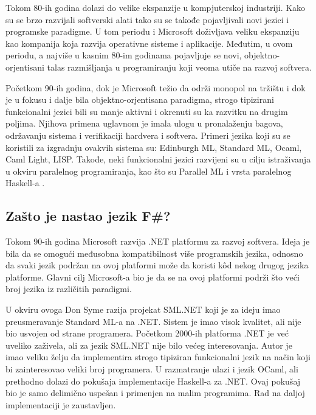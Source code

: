 \documentclass[a4paper]{article}
\begin{document}
Tokom 80-ih godina dolazi do velike ekspanzije u kompjuterskoj industriji. Kako su se brzo razvijali softverski alati tako su se takođe pojavljivali novi jezici i programske paradigme. U tom periodu i Microsoft doživljava veliku ekspanziju kao kompanija koja razvija operativne sisteme i aplikacije. Međutim, u ovom periodu, a najviše u kasnim 80-im godinama pojavljuje se novi, objektno-orjentisani talas razmišljanja u programiranju koji veoma utiče na razvoj softvera.

Početkom 90-ih godina, dok je Microsoft težio da održi monopol na tržištu i dok je u fokusu i dalje bila objektno-orjentisana paradigma, strogo tipizirani funkcionalni jezici bili su manje aktivni i okrenuti su ka razvitku na drugim poljima. Njihova primena uglavnom je imala ulogu u pronalaženju bagova, održavanju sistema i verifikaciji hardvera i softvera. Primeri jezika koji su se koristili za izgradnju ovakvih sistema su: Edinburgh ML, Standard ML, Ocaml, Caml Light, LISP. Takođe, neki funkcionalni jezici razvijeni su u cilju istraživanja u okviru paralelnog programiranja, kao što su Parallel ML i vrsta paralelnog Haskell-a \cite{early_history}. 

\subsection{Zašto je nastao jezik F\#?}
\label{subsec:nastanak}

Tokom 90-ih godina Microsoft razvija .NET \cite{microsoft_.net,early_history} platformu za razvoj softvera. Ideja je bila da se omogući međusobna kompatibilnost više programskih jezika, odnosno da svaki jezik podržan na ovoj platformi može da koristi kôd nekog drugog jezika platforme. Glavni cilj Microsoft-a bio je da se na ovoj platformi podrži što veći broj jezika iz različitih paradigmi. 

U okviru ovoga Don Syme razija projekat SML.NET koji je za ideju imao preusmeravanje Standard ML-a na .NET. Sistem je imao visok kvalitet, ali nije bio usvojen od strane programera. Početkom 2000-ih platforma .NET je već uveliko zaživela, ali za jezik SML.NET nije bilo većeg interesovanja. Autor je imao veliku želju da implementira strogo tipiziran funkcionalni jezik na način koji bi zainteresovao veliki broj programera. U razmatranje ulazi i jezik OCaml, ali prethodno dolazi do pokušaja implementacije Haskell-a za .NET. Ovaj pokušaj bio je samo delimično uspešan i primenjen na malim programima. Rad na daljoj implementaciji je zaustavljen.
\end{document}
